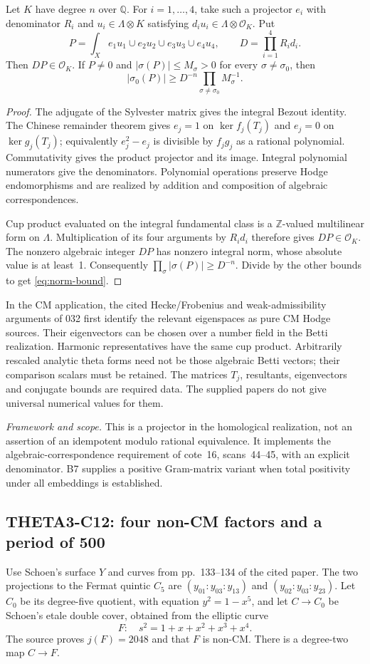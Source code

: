 \documentclass[11pt]{article}
\newcommand{\Q}{\mathbb Q}\newcommand{\C}{\mathbb C}\newcommand{\Z}{\mathbb Z}\newcommand{\R}{\mathbb R}\newcommand{\A}{\mathbb A}\newcommand{\OO}{\mathcal O}
\newcommand{\framework}[1]{\par\smallskip\noindent\textit{Framework and scope.} #1\par}
\theoremstyle{definition}\newtheorem{definition}[theorem]{Definition}\newtheorem{remark}[theorem]{Remark}
\begin{document}
Let $K$ have degree $n$ over $\Q$. For $i=1,\ldots,4$, take such a projector $e_i$ with denominator $R_i$ and $u_i\in\Lambda\otimes K$ satisfying
$d_i u_i\in\Lambda\otimes\OO_K$. Put
\[
 P=\int_X e_1u_1\cup e_2u_2\cup e_3u_3\cup e_4u_4,
 \qquad D=\prod_{i=1}^4R_i d_i.
\]
Then $DP\in\OO_K$. If $P\ne0$ and
$|\sigma(P)|\leq M_\sigma>0$ for every $\sigma\ne\sigma_0$, then
\begin{equation}\label{eq:norm-bound}
 |\sigma_0(P)|\geq D^{-n}\prod_{\sigma\ne\sigma_0}M_\sigma^{-1}.
\end{equation}
\begin{proof}
The adjugate of the Sylvester matrix gives the integral Bezout identity. The Chinese remainder theorem gives $e_j=1$ on $\ker f_j(T_j)$ and $e_j=0$ on $\ker g_j(T_j)$; equivalently $e_j^2-e_j$ is divisible by $f_jg_j$ as a rational polynomial. Commutativity gives the product projector and its image. Integral polynomial numerators give the denominators. Polynomial operations preserve Hodge endomorphisms and are realized by addition and composition of algebraic correspondences.

Cup product evaluated on the integral fundamental class is a $\Z$-valued multilinear form on $\Lambda$. Multiplication of its four arguments by $R_i d_i$ therefore gives $DP\in\OO_K$. The nonzero algebraic integer $DP$ has nonzero integral norm, whose absolute value is at least~1. Consequently
$\prod_\sigma|\sigma(P)|\geq D^{-n}$. Divide by the other bounds to get \eqref{eq:norm-bound}.
\end{proof}
In the CM application, the cited Hecke/Frobenius and weak-admissibility arguments of 032 first identify the relevant eigenspaces as pure CM Hodge sources. Their eigenvectors can be chosen over a number field in the Betti realization. Harmonic representatives have the same cup product. Arbitrarily rescaled analytic theta forms need not be those algebraic Betti vectors; their comparison scalars must be retained. The matrices $T_j$, resultants, eigenvectors and conjugate bounds are required data. The supplied papers do not give universal numerical values for them.
\framework{This is a projector in the homological realization, not an assertion of an idempotent modulo rational equivalence. It implements the algebraic-correspondence requirement of cote~16, scans~44--45, with an explicit denominator. B7 supplies a positive Gram-matrix variant when total positivity under all embeddings is established.}

\subsection{THETA3-C12: four non-CM factors and a period of 500}\label{C12}
Use Schoen's surface $Y$ and curves from pp.~133--134 of the cited paper. The two projections to the Fermat quintic $C_5$ are
$(y_{01}:y_{03}:y_{13})$ and $(y_{02}:y_{03}:y_{23})$.
Let $C_0$ be its degree-five quotient, with equation $y^2=1-x^5$, and let $C\to C_0$ be Schoen's etale double cover, obtained from the elliptic curve
\[
 F:\quad s^2=1+x+x^2+x^3+x^4.
\]
The source proves $j(F)=2048$ and that $F$ is non-CM. There is a degree-two map $C\to F$.
\end{document}
